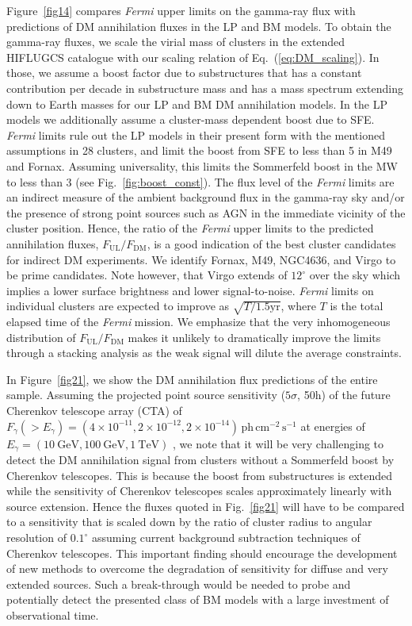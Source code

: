 \documentclass[10pt,aps,pra,reprint,amsmath,amsfonts,amssymb,showpacs,nofootinbib,floatfix]{revtex4-1}
\newcommand{\Fermi}{{\em Fermi}\xspace}
\newcommand{\rmn}{\mathrm}
\begin{document}
Figure~\ref{fig14} compares \Fermi upper limits on the gamma-ray flux
with predictions of DM annihilation fluxes in the LP and BM models.
To obtain the gamma-ray fluxes, we scale the virial mass of clusters
in the extended HIFLUGCS catalogue \cite{2007A&A...466..805C} with our
scaling relation of Eq.~(\ref{eq:DM_scaling}). In those, we assume a
boost factor due to substructures that has a constant contribution per
decade in substructure mass and has a mass spectrum extending down to
Earth masses for our LP and BM DM annihilation models. In the LP
models we additionally assume a cluster-mass dependent boost due to
SFE. \Fermi limits rule out the LP models in their present form with
the mentioned assumptions in 28 clusters, and limit the boost from SFE
to less than 5 in M49 and Fornax. Assuming universality, this limits
the Sommerfeld boost in the MW to less than 3 (see
Fig.~\ref{fig:boost_const}).  The flux level of the \Fermi limits are
an indirect measure of the ambient background flux in the gamma-ray
sky and/or the presence of strong point sources such as AGN in the
immediate vicinity of the cluster position. Hence, the ratio of the
\Fermi upper limits to the predicted annihilation fluxes,
$F_{\mathrm{UL}}/F_{\mathrm{DM}}$, is a good indication of the best
cluster candidates for indirect DM experiments. We identify Fornax,
M49, NGC4636, and Virgo to be prime candidates. Note however, that
Virgo extends of $12^\circ$ over the sky which implies a lower surface
brightness and lower signal-to-noise.  \Fermi limits on individual
clusters are expected to improve as $\sqrt{T/1.5 \mathrm{yr}}$, where
$T$ is the total elapsed time of the \Fermi mission. We emphasize that
the very inhomogeneous distribution of $F_{\mathrm{UL}}/
F_{\mathrm{DM}}$ makes it unlikely to dramatically improve the limits
through a stacking analysis as the weak signal will dilute the average
constraints.

In Figure~\ref{fig21}, we show the DM annihilation flux predictions of
the entire sample.  Assuming the projected point source sensitivity
($5\sigma$, 50h) of the future Cherenkov telescope array (CTA) of
$F_\gamma(>E_\gamma) = (4\times10^{-11}, 2\times10^{-12},
2\times10^{-14})\,\rmn{ph}\,\rmn{cm}^{-2}\,\rmn{s}^{-1}$ at energies
of $E_\gamma=(10~\rmn{GeV}, 100~\rmn{GeV}, 1~\rmn{TeV})$
\cite{Doro:2009qs}, we note that it will be very challenging to detect
the DM annihilation signal from clusters without a Sommerfeld boost by
Cherenkov telescopes.  This is because the boost from substructures is
extended while the sensitivity of Cherenkov telescopes scales
approximately linearly with source extension. Hence the fluxes
quoted in Fig.~\ref{fig21} will have to be compared to a sensitivity
that is scaled down by the ratio of cluster radius to angular
resolution of $0.1^\circ$ assuming current background subtraction
techniques of Cherenkov telescopes. This important finding should
encourage the development of new methods to overcome the degradation
of sensitivity for diffuse and very extended sources. Such a
break-through would be needed to probe and potentially detect the
presented class of BM models with a large investment of observational
time.
\end{document}
